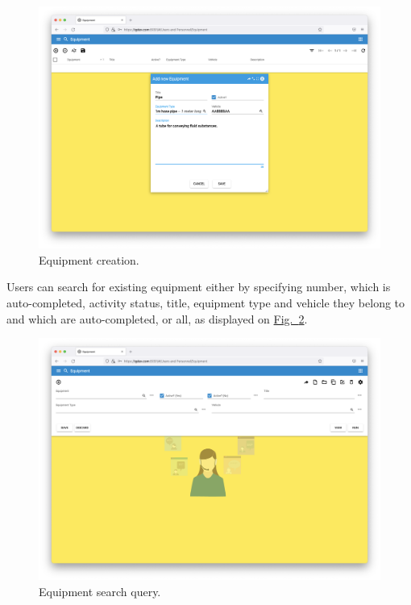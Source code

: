     \begin{figure}[!htbp]
	\centering
	\includegraphics[width=0.95\linewidth]{sections/equipment/images/Fig.12.png}
	\caption{Equipment creation.}\label{sections/equipment/images/Fig.12}
	\end{figure}

\newpage
Users can search for existing equipment either by specifying number, which is auto-completed, activity status, title, equipment type and vehicle they belong to and which are auto-completed, or all, as displayed on \hyperref[sections/equipment/images/Fig.13]{Fig.~\ref*{sections/equipment/images/Fig.13}}.

    \begin{figure}[!htbp]
	\centering
	\includegraphics[width=0.95\linewidth]{sections/equipment/images/Fig.13.png}
	\caption{Equipment search query.}\label{sections/equipment/images/Fig.13}
	\end{figure}
	
